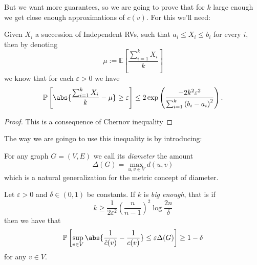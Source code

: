 \documentclass[11pt]{scrartcl}
\begin{document}
	But we want more guarantees, so we are going to prove that for $k$ large enough we get close enough approximations of $c(v)$. For this we'll need:
	\begin{proposition}
		Given $X_i$ a succession of Independent RVs, such that $a_i\le X_i \le b_i$ for every $i$, then by denoting 
		$$\mu := \mathbb{E}\left[\frac{\sum_{i=1}^{k}X_i}{k}\right]$$
		we know that for each $\varepsilon>0$ we have
		$$\mathbb{P}\left[\abs{\frac{\sum_{i=1}^{k}X_i}{k}-\mu}\ge \varepsilon\right]\le 2\exp\left(\frac{-2k^2\varepsilon^2}{\sum_{i=1}^{k}\left(b_i-a_i\right)^2}\right).$$
	\end{proposition}
	\begin{proof}
		This is a consequence of Chernov inequality
	\end{proof}
	The way we are goingo to use this inequality is by introducing:
	\begin{definition}[Diameter]
		For any graph $G=(V,E)$ we call its \textit{diameter} the amount
		$$\Delta(G)=\max_{u,v\in V}d(u,v)$$
		which is a natural generalization for the metric concept of diameter.
	\end{definition}
	\begin{proposition}
		Let $\varepsilon>0$ and $\delta\in (0,1)$ be constants. If $k$ is \textit{big enough}, that is if 
		$$k\ge \frac{1}{2\varepsilon^2}\left(\frac{n}{n-1}\right)^2\log\frac{2n}{\delta}$$
		then we have that
		$$\mathbb{P}\left[\sup_{v\in V}\abs{\frac{1}{\hat{c}(v)}-\frac{1}{c(v)}}\le \varepsilon\Delta(G)\right]\ge 1-\delta$$
		for any $v\in V$.
	\end{proposition}
\end{document}
